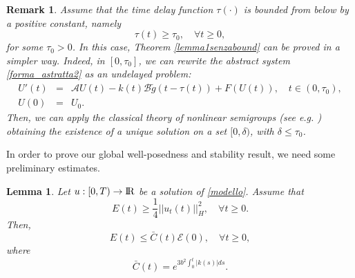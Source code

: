 \documentclass[11pt]{article}
\newcommand{\RR}{{{\rm I} \kern -.15em {\rm R} }}
\newtheorem{Lemma}[Theorem]{Lemma}
\newtheorem{Remark}[Theorem]{Remark}
\renewcommand{\geq}{\geqslant}
\renewcommand{\leq}{\leqslant}
\renewcommand{\le}{\leqslant}
\begin{document}
\begin{Remark}
	Assume that the time delay function $\tau(\cdot)$ is bounded from below by a positive constant, namely 
	\begin{equation}\label{lowerbound}
		\tau(t)\geq \tau_0,\quad\forall t\geq 0,
	\end{equation}
	for some $\tau_0>0$. In this case, Theorem \ref{lemma1senzabound} can be proved in a simpler way. Indeed, in $[0,\tau_0]$, we can rewrite the abstract system \eqref{forma_astratta2} as an undelayed problem:
	\begin{eqnarray*}
		U'(t)&=& \mathcal{A}U(t)-k(t)\mathcal{B}\tilde{g}(t-\tau(t))+F(U(t)), \quad t\in (0, \tau_0),\\
		U(0)&=&U_0.
	\end{eqnarray*}
	Then, we can apply the classical theory of nonlinear semigroups (see e.g. \cite{Pazy, PataZucchi}) obtaining the existence of a unique solution  on a set $[0,\delta)$, with $\delta \le\tau_0$.
\end{Remark}
In order to prove our global well-posedness and stability result, we need some preliminary estimates.
\begin{Lemma}\label{stimaE}
	Let $u:[0,T)\rightarrow \RR$ be a solution of \eqref{modello}.
	Assume that
	\begin{equation} \label{e(t)}
		E(t)\geq \frac{1}{4}||u_t(t)||_H^2,\quad \forall t\geq 0.
	\end{equation}
	Then,
	\begin{equation}
		\label{disuguaglianza energia}
		E(t)\leq \bar{C}(t)\mathcal{E}(0),\quad \forall t\geq 0,
	\end{equation}
	where
	\begin{equation}\label{Cbar}
		\bar{C}(t)=e^{3b^2\int_0^t|k(s)|  ds}.
	\end{equation}
\end{Lemma}
\end{document}
